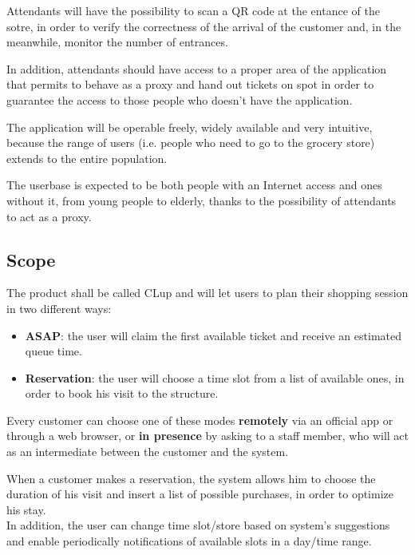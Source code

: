 \documentclass[12pt]{article}
\begin{document}
Attendants will have the possibility to scan a QR code at the entance of the sotre, in order to verify the correctness of the arrival of the customer and, in the meanwhile, monitor the number of entrances.

In addition, attendants should have access to a proper area of the application that permits to behave as a proxy and hand out tickets on spot in order to guarantee the access to those people who doesn't have the application.

The application will be operable freely, widely available and very intuitive, because the range of users (i.e. people who need to go to the grocery store) extends to the entire population.

The userbase is expected to be both people with an Internet access and ones without it, from young people to elderly, thanks to the possibility of attendants to act as a proxy.

\subsection{Scope}
The product shall be called CLup and will let users to plan their shopping session in two different ways:
\begin{itemize}
    \item {\textbf{ASAP}: the user will claim the first available ticket and receive an estimated queue time.}
    \item {\textbf{Reservation}: the user will choose a time slot from a list of available ones, in order to book his visit to the structure.}
\end{itemize}

Every customer can choose one of these modes \textbf{remotely} via an official app or through a web browser, or \textbf{in presence} by asking to a staff member, who will act as an intermediate between the customer and the system.

When a customer makes a reservation, the system allows him to choose the duration of his visit and insert a list of possible purchases, in order to optimize his stay.\\

In addition, the user can change time slot/store based on system's suggestions and enable periodically notifications of available slots in a day/time range.
\end{document}
